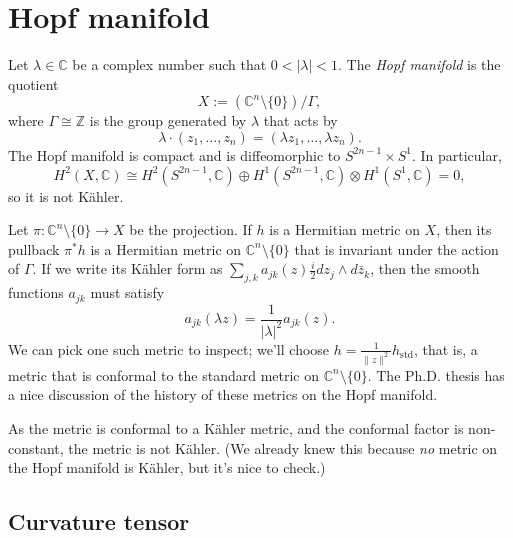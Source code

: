 \documentclass[10pt,a4paper]{article}
\newcommand{\kk}[1]{\mathbb{#1}}
\begin{document}
\section{Hopf manifold}
\label{sec:org8f5818e}

Let \(\lambda \in \kk C\) be a complex number such that \(0 < |\lambda| < 1\). The \emph{Hopf manifold} is the quotient
$$
X := (\kk C^n \setminus \{0\}) / \Gamma,
$$
where \(\Gamma \cong \kk Z\) is the group generated by \(\lambda\) that acts by
$$
\lambda \cdot (z_1, \ldots, z_n) = (\lambda z_1, \ldots, \lambda z_n).
$$
The Hopf manifold is compact and is diffeomorphic to \(S^{2n-1} \times S^1\). In particular,
$$
H^2(X, \kk C) \cong H^2(S^{2n-1}, \kk C) \oplus H^1(S^{2n-1}, \kk C) \otimes H^1(S^1, \kk C) = 0,
$$
so it is not K\"ahler.

Let \(\pi : \kk C^n \setminus \{0\} \to X\) be the projection. If \(h\) is a Hermitian metric on \(X\), then its pullback \(\pi^*h\) is a Hermitian metric on \(\kk C^n \setminus \{0\}\) that is invariant under the action of \(\Gamma\). If we write its K\"ahler form as \(\sum_{j,k} a_{jk}(z) \tfrac{i}{2} dz_j \wedge d\bar z_k\), then the smooth functions \(a_{jk}\) must satisfy
$$
a_{jk}(\lambda z) = \frac{1}{|\lambda|^2} a_{jk}(z).
$$
We can pick one such metric to inspect; we'll choose \(h = \frac{1}{\|z\|^2} h_{\mathrm{std}}\), that is, a metric that is conformal to the standard metric on \(\kk C^n \setminus \{0\}\). The Ph.D. thesis \cite{istrati:tel-02156198} has a nice discussion of the history of these metrics on the Hopf manifold.

As the metric is conformal to a K\"ahler metric, and the conformal factor is non-constant, the metric is not K\"ahler. (We already knew this because \emph{no} metric on the Hopf manifold is K\"ahler, but it's nice to check.)


\subsection{Curvature tensor}
\label{sec:org96d544d}
\end{document}
